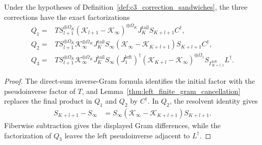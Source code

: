 \begin{lemma}
    \label{thm:c3_correction_factorizations}
    \leanok
    Under the hypotheses of
    Definition~\ref{def:c3_correction_sandwiches}, the three corrections have
    the exact factorizations
    \begin{align}
        Q_1={} & T S_{l+1}^{\oplus\Omega_K}
        (\mathcal K_{l+1}-\mathcal K_\infty)^{\oplus\Omega_K}
        J_K^{\mathrm{tail}}S_{K+l+1}C^\dagger, \\
        Q_2={} & T S_{l+1}^{\oplus\Omega_K}
        \mathcal K_\infty^{\oplus\Omega_K}J_K^{\mathrm{tail}}S_\infty
        (\mathcal K_\infty-\mathcal K_{K+l+1})
        S_{K+l+1}C^\dagger,                    \\
        Q_3={} & T S_{l+1}^{\oplus\Omega_K}
        \mathcal K_\infty^{\oplus\Omega_K}J_K^{\mathrm{tail}}S_\infty
        (J_1^{\mathrm{left}})^\dagger
        (\mathcal K_{K+l}-\mathcal K_\infty)^{\oplus\Omega_1}
        S_{\Gamma_{K+l,1}^{\mathrm{left}}}L^\dagger.
    \end{align}
\end{lemma}

\begin{proof}
    \leanok
    The direct-sum inverse-Gram formula identifies the initial factor with the
    pseudoinverse factor of $T$, and Lemma~\ref{thm:left_finite_gram_cancellation}
    replaces the final product in $Q_1$ and $Q_2$ by $C^\dagger$.
    In $Q_2$, the resolvent identity gives
    \begin{align}
        S_{K+l+1}-S_\infty
         & =S_\infty(\mathcal K_\infty-\mathcal K_{K+l+1})S_{K+l+1}.
    \end{align}
    Fiberwise subtraction gives the displayed Gram differences, while the
    factorization of $Q_3$ leaves the left pseudoinverse adjacent to
    $L^\dagger$.
\end{proof}

